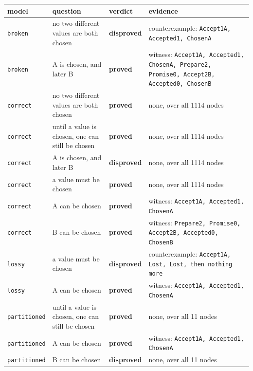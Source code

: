 \begin{longtable}{@{}p{}p{}p{}p{}@{}}
\toprule
model & question & verdict & evidence \\
\midrule
\endhead
\texttt{broken} & no two different values are both chosen & \textbf{disproved} & counterexample: \texttt{Accept1A, Accepted1, ChosenA} \\
\texttt{broken} & A is chosen, and later B & \textbf{proved} & witness: \texttt{Accept1A, Accepted1, ChosenA, Prepare2, Promise0, Accept2B, Accepted0, ChosenB} \\
\texttt{correct} & no two different values are both chosen & \textbf{proved} & none, over all 1114 nodes \\
\texttt{correct} & until a value is chosen, one can still be chosen & \textbf{proved} & none, over all 1114 nodes \\
\texttt{correct} & A is chosen, and later B & \textbf{disproved} & none, over all 1114 nodes \\
\texttt{correct} & a value must be chosen & \textbf{proved} & none, over all 1114 nodes \\
\texttt{correct} & A can be chosen & \textbf{proved} & witness: \texttt{Accept1A, Accepted1, ChosenA} \\
\texttt{correct} & B can be chosen & \textbf{proved} & witness: \texttt{Prepare2, Promise0, Accept2B, Accepted0, ChosenB} \\
\texttt{lossy} & a value must be chosen & \textbf{disproved} & counterexample: \texttt{Accept1A, Lost, Lost, then nothing more} \\
\texttt{lossy} & A can be chosen & \textbf{proved} & witness: \texttt{Accept1A, Accepted1, ChosenA} \\
\texttt{partitioned} & until a value is chosen, one can still be chosen & \textbf{proved} & none, over all 11 nodes \\
\texttt{partitioned} & A can be chosen & \textbf{proved} & witness: \texttt{Accept1A, Accepted1, ChosenA} \\
\texttt{partitioned} & B can be chosen & \textbf{disproved} & none, over all 11 nodes \\
\bottomrule
\end{longtable}
